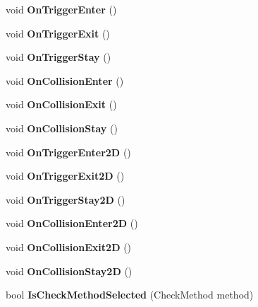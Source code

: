 \begin{DoxyCompactItemize}
void {\bfseries On\+Trigger\+Enter} ()
\item 
\mbox{\label{class_unity_test_1_1_assertion_component_abbdae424c831c57d219324b07dc691ac}} 
void {\bfseries On\+Trigger\+Exit} ()
\item 
\mbox{\label{class_unity_test_1_1_assertion_component_a6a6c17941dbb7059e26f1dbe0ea4553a}} 
void {\bfseries On\+Trigger\+Stay} ()
\item 
\mbox{\label{class_unity_test_1_1_assertion_component_aa2f77f5b3b5b54f9ddf40f4ca10ee1cd}} 
void {\bfseries On\+Collision\+Enter} ()
\item 
\mbox{\label{class_unity_test_1_1_assertion_component_a7706783cc514093d58b327d3c57c898c}} 
void {\bfseries On\+Collision\+Exit} ()
\item 
\mbox{\label{class_unity_test_1_1_assertion_component_afc2758880e2848e9de74a489459aca75}} 
void {\bfseries On\+Collision\+Stay} ()
\item 
\mbox{\label{class_unity_test_1_1_assertion_component_ad2b26ced505e89ef3382e8bd9866391b}} 
void {\bfseries On\+Trigger\+Enter2D} ()
\item 
\mbox{\label{class_unity_test_1_1_assertion_component_a126f2d03a17ce4a92d55c150e2eb2fba}} 
void {\bfseries On\+Trigger\+Exit2D} ()
\item 
\mbox{\label{class_unity_test_1_1_assertion_component_a1c1d6d290cdb066f87adbc906120cf88}} 
void {\bfseries On\+Trigger\+Stay2D} ()
\item 
\mbox{\label{class_unity_test_1_1_assertion_component_ac1cec6e8ef5baca9ed683bfa89665b03}} 
void {\bfseries On\+Collision\+Enter2D} ()
\item 
\mbox{\label{class_unity_test_1_1_assertion_component_a519d7a19b6c80ad55f8b4ec1d68f85c7}} 
void {\bfseries On\+Collision\+Exit2D} ()
\item 
\mbox{\label{class_unity_test_1_1_assertion_component_a2d68f36a0afd844717fb967fa5e793ab}} 
void {\bfseries On\+Collision\+Stay2D} ()
\item 
\mbox{\label{class_unity_test_1_1_assertion_component_a1c0952925c3fe171a66f5622ead2d3b2}} 
bool {\bfseries Is\+Check\+Method\+Selected} (Check\+Method method)
\end{DoxyCompactItemize}
